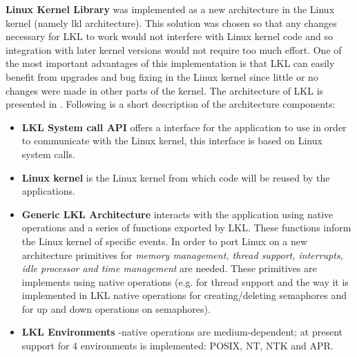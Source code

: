 \textbf{Linux Kernel Library} was implemented as a new architecture in the Linux kernel (namely lkl architecture). This solution was chosen so that any changes necessary for LKL to work would not interfere with Linux kernel code and so integration with later kernel versions would not require too much effort. One of the most important advantages of this implementation is that LKL can easily benefit from upgrades and bug fixing in the Linux kernel since little or no changes were made in other parts of the kernel. 
The architecture of LKL is presented in .
Following is a short description of the architecture components:
\begin{itemize}
\item \textbf{LKL System call API} offers a interface for the application to use in order to communicate with the Linux kernel, this interface is based on Linux system calls.
\item \textbf{Linux kernel} is the Linux kernel from which code will be reused by the applications. 
\item \textbf{Generic LKL Architecture} interacts with the application using native operations and a series of functions exported by LKL. These functions inform the Linux kernel of specific events. In order to port Linux on a new architecture primitives for \textit{memory management, thread support, interrupts, idle processor and time management} are needed. These primitives are implements using native operations (e.g. for thread support and the way it is implemented in LKL native operations for creating/deleting semaphores and for up and down operations on semaphores). 
\item \textbf{LKL Environments} -native operations are medium-dependent; at present support for 4 environments is implemented:  POSIX, NT, NTK and APR. 
\end{itemize}
\begin{comment}
\begin{itemize}
\item \textit{Memory management mechanism} LKL has implemented a native function for memory allocation.
\item \textit{Thread support} LKL needs an implementation for kernel threads for which purpose native operation for working with threads are required. These operations will be converted by the \textbf{lkl architecture} in order to work with the Linux kernel. Native operations for creating/deleting semaphores and for up and down operations.
\item \textit{Interrupts}
\item \textit{Idle processor}
\item \textit{Time management} 
\end{itemize} 
\end{comment}
